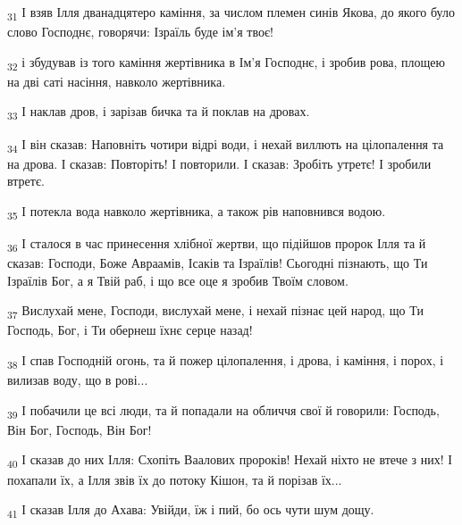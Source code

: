 \begin{tcolorbox}
\textsubscript{31} І взяв Ілля дванадцятеро каміння, за числом племен синів Якова, до якого було слово Господнє, говорячи: Ізраїль буде ім'я твоє!
\end{tcolorbox}
\begin{tcolorbox}
\textsubscript{32} і збудував із того каміння жертівника в Ім'я Господнє, і зробив рова, площею на дві саті насіння, навколо жертівника.
\end{tcolorbox}
\begin{tcolorbox}
\textsubscript{33} І наклав дров, і зарізав бичка та й поклав на дровах.
\end{tcolorbox}
\begin{tcolorbox}
\textsubscript{34} І він сказав: Наповніть чотири відрі води, і нехай виллють на цілопалення та на дрова. І сказав: Повторіть! І повторили. І сказав: Зробіть утретє! І зробили втретє.
\end{tcolorbox}
\begin{tcolorbox}
\textsubscript{35} І потекла вода навколо жертівника, а також рів наповнився водою.
\end{tcolorbox}
\begin{tcolorbox}
\textsubscript{36} І сталося в час принесення хлібної жертви, що підійшов пророк Ілля та й сказав: Господи, Боже Авраамів, Ісаків та Ізраїлів! Сьогодні пізнають, що Ти Ізраїлів Бог, а я Твій раб, і що все оце я зробив Твоїм словом.
\end{tcolorbox}
\begin{tcolorbox}
\textsubscript{37} Вислухай мене, Господи, вислухай мене, і нехай пізнає цей народ, що Ти Господь, Бог, і Ти обернеш їхнє серце назад!
\end{tcolorbox}
\begin{tcolorbox}
\textsubscript{38} І спав Господній огонь, та й пожер цілопалення, і дрова, і каміння, і порох, і вилизав воду, що в рові...
\end{tcolorbox}
\begin{tcolorbox}
\textsubscript{39} І побачили це всі люди, та й попадали на обличчя свої й говорили: Господь, Він Бог, Господь, Він Бог!
\end{tcolorbox}
\begin{tcolorbox}
\textsubscript{40} І сказав до них Ілля: Схопіть Ваалових пророків! Нехай ніхто не втече з них! І похапали їх, а Ілля звів їх до потоку Кішон, та й порізав їх...
\end{tcolorbox}
\begin{tcolorbox}
\textsubscript{41} І сказав Ілля до Ахава: Увійди, їж і пий, бо ось чути шум дощу.
\end{tcolorbox}
